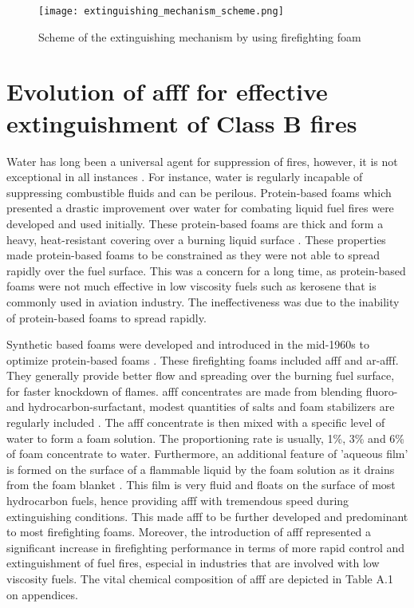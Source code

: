 \begin{figure}[H]
    \centering
    \texttt{[image: extinguishing\_mechanism\_scheme.png]}
    \caption{Scheme of the extinguishing mechanism by using firefighting foam \cite{turekova2011environmental}}
    \label{ch2:figure:scheme}
\end{figure}

\section{Evolution of \acrshort{afff} for effective extinguishment of Class B fires}
Water has long been a universal agent for suppression of fires, however, it is not exceptional in all instances \cite{hinnant2020characterizing}. For instance, water is regularly incapable of suppressing combustible fluids and can be perilous. Protein-based foams which presented a drastic improvement over water for combating liquid fuel fires were developed and used initially. These protein-based foams are thick and form a heavy, heat-resistant covering over a burning liquid surface \cite{scheffey1995evaluating}. These properties made protein-based foams to be constrained as they were not able to spread rapidly over the fuel surface. This was a concern for a long time, as protein-based foams were not much effective in low viscosity fuels such as kerosene that is commonly used in aviation industry. The ineffectiveness was due to the inability of protein-based foams to spread rapidly.

Synthetic based foams were developed and introduced in the mid-1960s to optimize protein-based foams \cite{aamodt2020review} . These firefighting foams included \acrshort{afff} and \acrshort{ar-afff}. They generally provide better flow and spreading over the burning fuel surface, for faster knockdown of flames. \acrshort{afff} concentrates are made from blending fluoro-and hydrocarbon-surfactant, modest quantities of salts and foam stabilizers are regularly included \cite{wang2019research}. The \acrshort{afff} concentrate is then mixed with a specific level of water to form a foam solution. The proportioning rate is usually, 1\%, 3\% and 6\% of foam concentrate to water. Furthermore, an additional feature of 'aqueous film' is formed on the surface of a flammable liquid by the foam solution as it drains from the foam blanket \cite{hinnant2020characterizing}. This film is very fluid and floats on the surface of most hydrocarbon fuels, hence providing \acrshort{afff} with tremendous speed during extinguishing conditions. This made \acrshort{afff} to be further developed and predominant to most firefighting foams. Moreover, the introduction of \acrshort{afff} represented a significant increase in firefighting performance in terms of more rapid control and extinguishment of fuel fires, especial in industries that are involved with low viscosity fuels. The vital chemical composition of \acrshort{afff} are depicted in Table A.1 on appendices.

